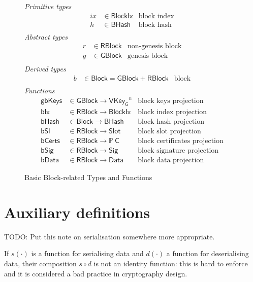 \documentclass[11pt,a4paper]{article}
\newcommand{\powerset}[1]{\mathbb{P}~#1}
\newcommand{\fun}[1]{\mathsf{#1}}
\newcommand{\type}[1]{\mathsf{#1}}
\newcommand{\BHash}{\type{BHash}}  %
\newcommand{\Slot}{\type{Slot}}
\newcommand{\BlockIx}{\type{BlockIx}}
\newcommand{\GBlock}{\type{GBlock}}
\newcommand{\RBlock}{\type{RBlock}}
\newcommand{\Block}{\type{Block}}
\newcommand{\HCert}{\type{C}}
\newcommand{\VKeyGen}{\type{VKey_G}}
\newcommand{\Sig}{\type{Sig}}
\newcommand{\Data}{\type{Data}}
\newcommand{\hashname}{bHash}
\newcommand{\bdataname}{bData}
\newcommand{\bcertsname}{bCerts}
\newcommand{\bsigname}{bSig}
\newcommand{\bixname}{bIx}
\newcommand{\bslname}{bSl}
\newcommand{\totalf}{\to}
\begin{document}
\begin{figure}
  \emph{Primitive types}
  \begin{align*}
    ix & \in \BlockIx & \text{block index}\\
     h & \in \BHash   & \text{block hash}\\
  \end{align*}
  \emph{Abstract types}
  \begin{align*}
    r & \in \RBlock & \text{non-genesis block} \\
    g & \in \GBlock & \text{genesis block} \\
  \end{align*}
  \emph{Derived types}
  \begin{align*}
    b & \in \Block = \GBlock + \RBlock & \text{block} \\
  \end{align*}
  \emph{Functions}
  \begin{align*}
    \text{$\fun{gbKeys}$} & \in \GBlock \totalf \VKeyGen^n & \text{block keys projection} \\
    \text{$\fun{\bixname}$} & \in \RBlock \totalf \BlockIx & \text{block index projection} \\
    \text{$\fun{\hashname}$} & \in \Block \totalf \BHash
      & \text{block hash projection} \\
    \text{$\fun{\bslname}$} & \in \RBlock \totalf \Slot & \text{block slot projection} \\
    \text{$\fun{\bcertsname}$} & \in \RBlock \totalf \powerset{\HCert}
      & \text{block certificates projection} \\
    \text{$\fun{\bsigname}$} & \in \RBlock \totalf \Sig & \text{block signature projection} \\
    \text{$\fun{\bdataname}$} & \in \RBlock \totalf \Data & \text{block data projection}
  \end{align*}
  \caption{Basic Block-related Types and Functions}
  \label{fig:block-defs}
\end{figure}


\section{Auxiliary definitions}
\label{sec:auxil-defin}
TODO: Put this note on serialisation somewhere more appropriate.

If $s(\cdot)$ is a function for serialising data and $d(\cdot)$ a function for
deserialising data, their composition $s \circ d$ is not an identity function:
%
this is hard to enforce and it is considered a bad practice in cryptography
design.
\end{document}
